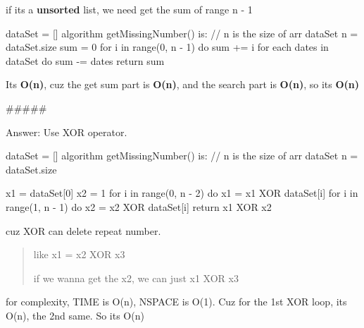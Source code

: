 \documentclass[
]{article}
\newenvironment{Shaded}{}{}
\newcommand{\NormalTok}[1]{#1}
\begin{document}
if its a \textbf{unsorted} list, we need get the sum of range n - 1

\begin{Shaded}
\begin{Highlighting}[]
\NormalTok{dataSet = []}
\NormalTok{algorithm getMissingNumber() is:}
\NormalTok{	// n is the size of arr dataSet}
\NormalTok{	n = dataSet.size}
\NormalTok{	sum = 0}
\NormalTok{	for i in range(0, n {-} 1) do}
\NormalTok{		sum += i}
\NormalTok{	for each dates in dataSet do}
\NormalTok{		sum {-}= dates}
\NormalTok{	return sum}
\end{Highlighting}
\end{Shaded}

Its \textbf{O(n)}, cuz the get sum part is \textbf{O(n)}, and the search
part is \textbf{O(n)}, so its \textbf{O(n)}

\#\#\#\#\#

Answer: Use XOR operator.

\begin{Shaded}
\begin{Highlighting}[]
\NormalTok{dataSet = []}
\NormalTok{algorithm getMissingNumber() is:}
\NormalTok{	// n is the size of arr dataSet}
\NormalTok{	n = dataSet.size}
	
\NormalTok{	x1 = dataSet[0]}
\NormalTok{	x2 = 1}
\NormalTok{	for i in range(0, n {-} 2) do}
\NormalTok{		x1 = x1 XOR dataSet[i]}
\NormalTok{	for i in range(1, n {-} 1) do}
\NormalTok{		x2 = x2 XOR dataSet[i]}
\NormalTok{	return x1 XOR x2}
	
\end{Highlighting}
\end{Shaded}

cuz XOR can delete repeat number.

\begin{quote}
like x1 = x2 XOR x3

if we wanna get the x2, we can just x1 XOR x3
\end{quote}

for complexity, TIME is O(n), NSPACE is O(1). Cuz for the 1st XOR loop,
its O(n), the 2nd same. So its O(n)
\end{document}

